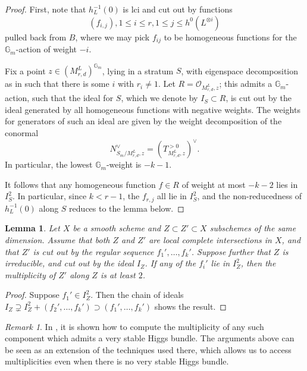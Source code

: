 \documentclass{amsart}
\theoremstyle{plain}
\newtheorem{lemma}[theorem]{Lemma}
\theoremstyle{definition}
\theoremstyle{remark}
\newtheorem{remark}[theorem]{Remark}
\begin{document}
\begin{proof}
    First, note that $h_L^{-1}(0)$ is lci and cut out by functions 
    \[(f_{i,j}),1\le i\le r,1\le j \le h^0(L^{\otimes i})\]
    pulled back from $B$, where we may pick $f_{ij}$ to be homogeneous functions for the $\mathbb{G}_m$-action of weight $-i$. 
    
    Fix a point $z\in (M_{r,d}^L)^{\mathbb{G}_m}$, lying in a stratum $S$, with eigenspace decomposition as in  such that there is some $i$ with $r_i\neq 1$.
    Let $R = \mathcal O_{M_{r,d}^L, z}$; this admits a $\mathbb{G}_m$-action, such that the ideal for $S$, which we denote by $I_S\subset R$, is cut out by the ideal generated by all homogeneous functions with negative weights.
    The weights for generators of such an ideal are given by the weight decomposition of the conormal
    \[N_{S_m/M_{r,d}^L, z}^{\vee} = (T_{M_{r,d}^L, z}^{>0})^{\vee}.\]
    In particular, the lowest $\mathbb{G}_m$-weight is $-k-1$.
    
    It follows that any homogeneous function $f\in R$ of weight at most $-k-2$ lies in $I_S^2$.
    In particular, since $k<r-1$, the $f_{r, j}$ all lie in $I_S^2$, and the non-reducedness of $h_L^{-1}(0)$ along $S$ reduces to the lemma below. 
\end{proof}


\begin{lemma}
    Let $X$ be a smooth scheme and $Z\subset Z'\subset X$ subschemes of the same dimension.
    Assume that both $Z$ and $Z'$ are local complete intersections in $X$, and that $Z'$ is cut out by the regular sequence $f_1',\dots, f_k'$.
    Suppose further that $Z$ is irreducible, and cut out by the ideal $I_Z$. If any of the $f_i'$ lie in $I_Z^2$, then the multiplicity of $Z'$ along $Z$ is at least $2$. 
\end{lemma}
\begin{proof}
    Suppose $f_1'\in I_Z^2$. Then the chain of ideals $I_Z\supsetneq I_Z^2 + (f_2', \dots, f_k')\supset (f_1', \dots, f_k')$ shows the result.  
\end{proof}

\begin{remark}
    In \cite[Theorem 5.2]{HH}, it is shown how to compute the multiplicity of any such component which admits a very stable Higgs bundle.
    The arguments above can be seen as an extension of the techniques used there, which allows us to access multiplicities even when there is no very stable Higgs bundle. 
\end{remark}
\end{document}
